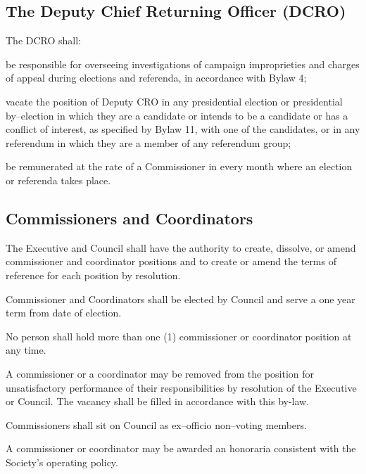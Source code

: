 \subsection {The Deputy Chief Returning Officer (DCRO)} 
\begin{longenum}[ label*=\thesubsection.\arabic*., align=left]
	\item The DCRO shall: 
    \begin{longenum}[ label*=\arabic*., align=left]
		\item be responsible for overseeing investigations of campaign improprieties and charges of appeal during elections and referenda, in accordance with Bylaw 4;
        \item vacate the position of Deputy CRO in any presidential election or presidential by--election in which they are a candidate or intends to be a candidate or has a conflict of interest, as specified by Bylaw 11, with one of the candidates, or in any referendum in which they are a member of any referendum group; 
        \item be remunerated at the rate of a Commissioner in every month where an election or referenda takes place.
	\end{longenum}    
\end{longenum}
\subsection {Commissioners and Coordinators} 
\begin{longenum}[ label*=\thesubsection.\arabic*., align=left]
	\item The Executive and Council shall have the authority to create, dissolve, or amend commissioner and coordinator positions and to create or amend the terms of reference for each position by resolution. 
    \item Commissioner and Coordinators shall be elected by Council and serve a one year term from date of election. 
    \item No person shall hold more than one (1) commissioner or coordinator position at any time.
    \item A commissioner or a coordinator may be removed from the position for unsatisfactory performance of their responsibilities by resolution of the Executive or Council. The vacancy shall be filled in accordance with this by-law.  
    \item Commissioners shall sit on Council as ex--officio non--voting members.
    
    \item A commissioner or coordinator may be awarded an honoraria consistent with the Society's operating policy.
\end{longenum}

